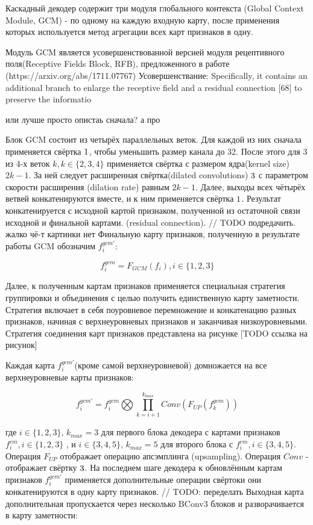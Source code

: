 Каскадный декодер содержит три модуля глобального контекста (Global Context Module, GCM) - по одному на каждую входную карту, после применения которых
используется метод агрегации всех карт признаков в одну. 

Модуль GCM является усовершенствованной версией модуля рецептивного поля(Receptive Fields Block, RFB), предложенного в работе \cite{RFB} (https://arxiv.org/abs/1711.07767)
Усовершенствание: 
Specifically, it contains an additional branch to enlarge the
receptive field and a residual connection [68] to preserve the
informatio

или лучше просто опистаь сначала? а про

Блок GCM состоит из четырёх параллельных веток. Для каждой из них сначала применяется свёртка $1 \time 1$, чтобы уменьшить размер 
канала до 32. После этого для 3 из 4-х веток $k, k \in \{2,3,4\}$ применяется свёртка с размером ядра(kernel size) $2k-1$. За ней 
следует расширенная свёртка(dilated convolutions) $3 \time 3$ с параметром скорости расширения (dilation rate) равным $2k-1$.
Далее, выходы всех чётырёх ветвей конкатенируются вместе, и к ним применяется свёртка $1 \time 1$. 
Результат конкатенируется с исходной картой признаком, полученной из остаточной связи исходной и финальной картами. (residual connection). // TODO подредачить. жалко чё-т картинки нет
Финальную карту признаков, полученную в результате работы GCM обозначим $f_i^{gcm'}$:

\begin{equation}
    f_i^{gcm} = F_{GCM}(f_i), i \in \{1,2,3\}
\end{equation}

Далее, к полученным картам признаков применяется специальная стратегия группировки и объединения с целью получить единственную
карту заметности. Стратегия включает в себя  поуровневое перемножение и конкатенацию разных признаков, начиная с верхнеуровневых признаков
и заканчивая низкоуровневыми. Стратегия соединения карт признаков представлена на рисунке [TODO ссылка на рисунок]

Каждая карта $f_i^{gcm'}$(кроме самой верхнеуровневой) домножается на все верхнеуровневые карты признаков:

\begin{equation}
    f_i^{gcm'} = f_i^{gcm} \bigotimes \prod_{k=i+1}^{k_{max}}Conv(F_{UP}(f_k^{gcm}))
\end{equation}

где $i \in \{1,2,3\}$, $k_{max}=3$ для первого блока декодера с картами признаков $f_i^{cm}, i \in \{1,2,3\}$ , и
$i \in \{3,4,5\}$, $k_{max}=5$ для второго блока с $f_i^{cm}, i \in \{3,4,5\}$. Операция $F_{UP}$ отображает
операцию апсэмплинга (upsampling). Операция $Conv$ - отображает свёртку $3 \time 3$.
На последнем шаге декодера к обновлённым картам признаков $f_i^{gcm'}$  применяется дополнительные операции свёртоки они конкатенируются
в одну карту признаков. 
// TODO: переделать Выходная карта дополнительная пропускается через несколько BConv3 блоков и разворачивается в карту заметности:

